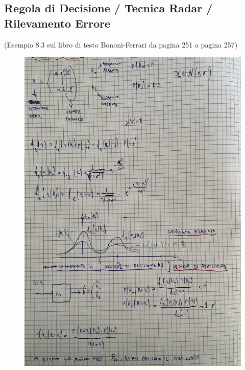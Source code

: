 \documentclass{article}
\begin{document}
\subsection{ Regola di Decisione / Tecnica Radar / Rilevamento Errore}
(Esempio 8.3 sul libro di testo Bononi-Ferrari da pagina 251 a pagina 257)
\begin{figure}[H]
\centering
\includegraphics[scale=0.13]{ese/24.jpeg}
\end{figure} 
\end{document}
